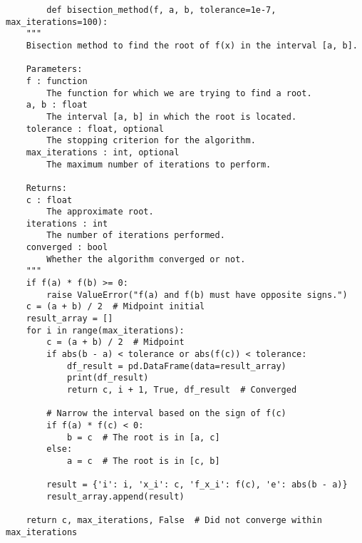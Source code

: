 \documentclass{article}
\begin{document}
    \begin{verbatim}
        def bisection_method(f, a, b, tolerance=1e-7, max_iterations=100):
    """
    Bisection method to find the root of f(x) in the interval [a, b].

    Parameters:
    f : function
        The function for which we are trying to find a root.
    a, b : float
        The interval [a, b] in which the root is located.
    tolerance : float, optional
        The stopping criterion for the algorithm.
    max_iterations : int, optional
        The maximum number of iterations to perform.

    Returns:
    c : float
        The approximate root.
    iterations : int
        The number of iterations performed.
    converged : bool
        Whether the algorithm converged or not.
    """
    if f(a) * f(b) >= 0:
        raise ValueError("f(a) and f(b) must have opposite signs.")
    c = (a + b) / 2  # Midpoint initial
    result_array = []
    for i in range(max_iterations):
        c = (a + b) / 2  # Midpoint
        if abs(b - a) < tolerance or abs(f(c)) < tolerance:
            df_result = pd.DataFrame(data=result_array)
            print(df_result)
            return c, i + 1, True, df_result  # Converged

        # Narrow the interval based on the sign of f(c)
        if f(a) * f(c) < 0:
            b = c  # The root is in [a, c]
        else:
            a = c  # The root is in [c, b]

        result = {'i': i, 'x_i': c, 'f_x_i': f(c), 'e': abs(b - a)}
        result_array.append(result)

    return c, max_iterations, False  # Did not converge within max_iterations

    \end{verbatim}
\end{document}
